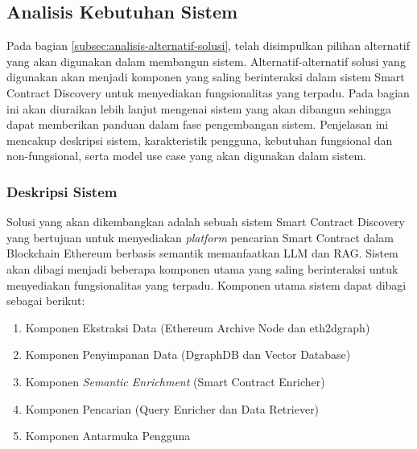 \subsection{Analisis Kebutuhan Sistem}

Pada bagian \ref{subsec:analisis-alternatif-solusi}, telah disimpulkan pilihan alternatif yang akan digunakan dalam membangun sistem. Alternatif-alternatif solusi yang digunakan akan menjadi komponen yang saling berinteraksi dalam sistem Smart Contract Discovery untuk menyediakan fungsionalitas yang terpadu. Pada bagian ini akan diuraikan lebih lanjut mengenai sistem yang akan dibangun sehingga dapat memberikan panduan dalam fase pengembangan sistem. Penjelasan ini mencakup deskripsi sistem, karakteristik pengguna, kebutuhan fungsional dan non-fungsional, serta model use case yang akan digunakan dalam sistem.

\subsubsection{Deskripsi Sistem}

Solusi yang akan dikembangkan adalah sebuah sistem Smart Contract Discovery yang bertujuan untuk menyediakan \textit{platform} pencarian Smart Contract dalam Blockchain Ethereum berbasis semantik memanfaatkan LLM dan RAG. Sistem akan dibagi menjadi beberapa komponen utama yang saling berinteraksi untuk menyediakan fungsionalitas yang terpadu. Komponen utama sistem dapat dibagi sebagai berikut:

\begin{enumerate}
  \item Komponen Ekstraksi Data (Ethereum Archive Node dan eth2dgraph)
  \item Komponen Penyimpanan Data (DgraphDB dan Vector Database)
  \item Komponen \textit{Semantic Enrichment} (Smart Contract Enricher)
  \item Komponen Pencarian (Query Enricher dan Data Retriever)
  \item Komponen Antarmuka Pengguna
\end{enumerate}

